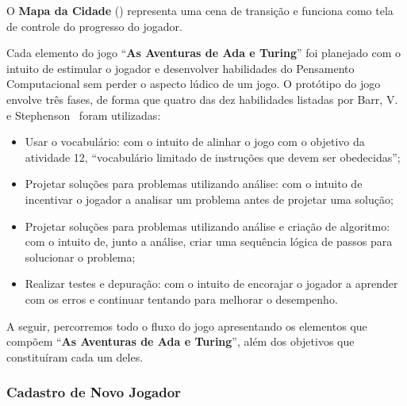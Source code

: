 O  \textbf{Mapa da Cidade} () representa uma cena de transição e funciona como tela de controle do progresso do jogador.





Cada elemento do jogo “\textbf{As Aventuras de Ada e Turing}” foi planejado com o intuito de estimular o jogador e desenvolver habilidades do Pensamento Computacional sem perder o aspecto lúdico de um jogo. O protótipo do jogo envolve três fases, de forma que quatro das dez habilidades listadas por Barr, V. e Stephenson~\cite{barr_bringing_2011} foram utilizadas:

\begin{itemize}
	\item Usar o vocabulário: com o intuito de alinhar o jogo com o objetivo da atividade 12, “vocabulário limitado de instruções que devem ser obedecidas”;
	\item Projetar soluções para problemas utilizando análise: com o intuito de incentivar o jogador a analisar um problema antes de projetar uma solução;
	\item Projetar soluções para problemas utilizando análise e criação de algoritmo: com o intuito de, junto a análise, criar uma sequência lógica de passos para solucionar o problema;
	\item Realizar testes e depuração: com o intuito de encorajar o jogador a aprender com os erros e continuar tentando para melhorar o desempenho.
\end{itemize}

A seguir, percorremos todo o fluxo do jogo apresentando os elementos que compõem “\textbf{As Aventuras de Ada e Turing}”, além dos objetivos que constituíram cada um deles.

\subsubsection{Cadastro de Novo Jogador} \label{sssec:cadastro}

